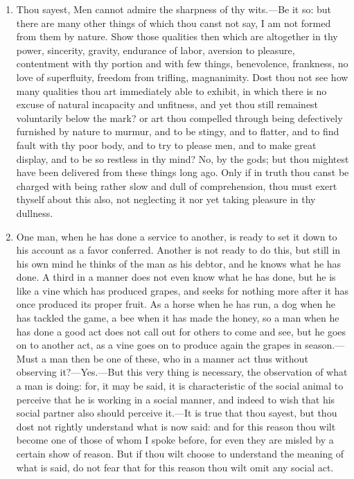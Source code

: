 \begin{enumerate}
\item Thou sayest, Men cannot admire the sharpness of thy wits.—Be it so: but there are many other things of which thou canst not say, I am not formed from them by nature. Show those qualities then which are altogether in thy power, sincerity, gravity, endurance of labor, aversion to pleasure, contentment with thy portion and with few things, benevolence, frankness, no love of superfluity, freedom from trifling, magnanimity. Dost thou not see how many qualities thou art immediately able to exhibit, in which there is no excuse of natural incapacity and unfitness, and yet thou still remainest voluntarily below the mark? or art thou compelled through being defectively furnished by nature to murmur, and to be stingy, and to flatter, and to find fault with thy poor body, and to try to please men, and to make great display, and to be so restless in thy mind? No, by the gods; but thou mightest have been delivered from these things long ago. Only if in truth thou canst be charged with being rather slow and dull of comprehension, thou must exert thyself about this also, not neglecting it nor yet taking pleasure in thy dullness.

\item One man, when he has done a service to another, is ready to set it down to his account as a favor conferred. Another is not ready to do this, but still in his own mind he thinks of the man as his debtor, and he knows what he has done. A third in a manner does not even know what he has done, but he is like a vine which has produced grapes, and seeks for nothing more after it has once produced its proper fruit. As a horse when he has run, a dog when he has tackled the game, a bee when it has made the honey, so a man when he has done a good act does not call out for others to come and see, but he goes on to another act, as a vine goes on to produce again the grapes in season.—Must a man then be one of these, who in a manner act thus without observing it?—Yes.—But this very thing is necessary, the observation of what a man is doing: for, it may be said, it is characteristic of the social animal to perceive that he is working in a social manner, and indeed to wish that his social partner also should perceive it.—It is true that thou sayest, but thou dost not rightly understand what is now said: and for this reason thou wilt become one of those of whom I spoke before, for even they are misled by a certain show of reason. But if thou wilt choose to understand the meaning of what is said, do not fear that for this reason thou wilt omit any social act.


\end{enumerate}
